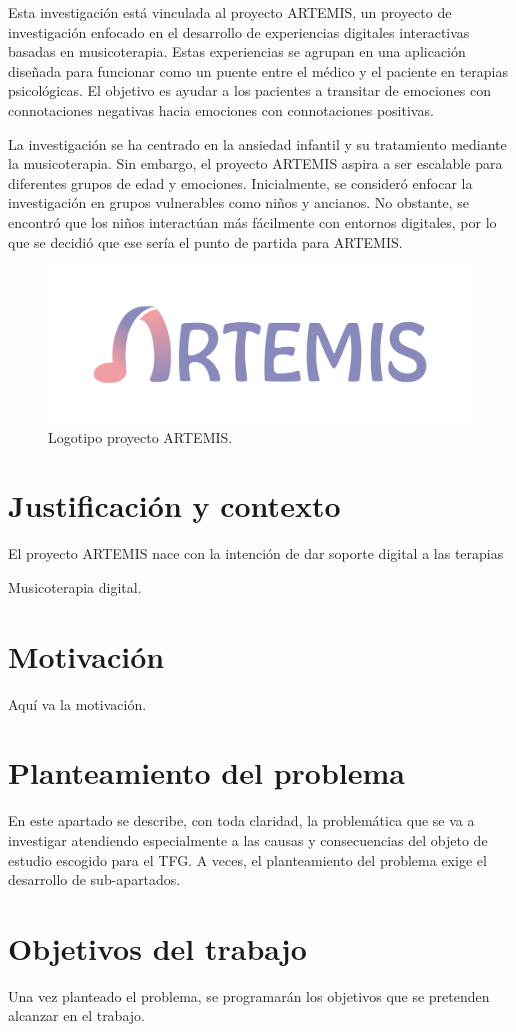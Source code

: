 Esta investigación está vinculada al proyecto ARTEMIS, un proyecto de investigación enfocado en el desarrollo de experiencias digitales interactivas basadas en musicoterapia. Estas experiencias se agrupan en una aplicación diseñada para funcionar como un puente entre el médico y el paciente en terapias psicológicas. El objetivo es ayudar a los pacientes a transitar de emociones con connotaciones negativas hacia emociones con connotaciones positivas.

La investigación se ha centrado en la ansiedad infantil y su tratamiento mediante la musicoterapia. Sin embargo, el proyecto ARTEMIS aspira a ser escalable para diferentes grupos de edad y emociones. Inicialmente, se consideró enfocar la investigación en grupos vulnerables como niños y ancianos. No obstante, se encontró que los niños interactúan más fácilmente con entornos digitales, por lo que se decidió que ese sería el punto de partida para ARTEMIS.

\begin{figure} [h!]
	\centering
	\includegraphics[width=0.7\linewidth]{Figuras/Introduccion/1_LogoArtemis}
	\caption{Logotipo proyecto ARTEMIS.}
	\label{fig:logoArtemis}
\end{figure}

\section{Justificación y contexto}

El proyecto ARTEMIS nace con la intención de dar soporte digital a las terapias

Musicoterapia digital.

\section{Motivación}

Aquí va la motivación.

\section{Planteamiento del problema}

En este apartado se describe, con toda claridad, la problemática que se va a investigar atendiendo especialmente a las causas y consecuencias del objeto de estudio escogido para el TFG. A veces, el planteamiento del problema exige el desarrollo de sub-apartados.

\section{Objetivos del trabajo}

Una vez planteado el problema, se programarán los objetivos que se pretenden alcanzar en el trabajo.
